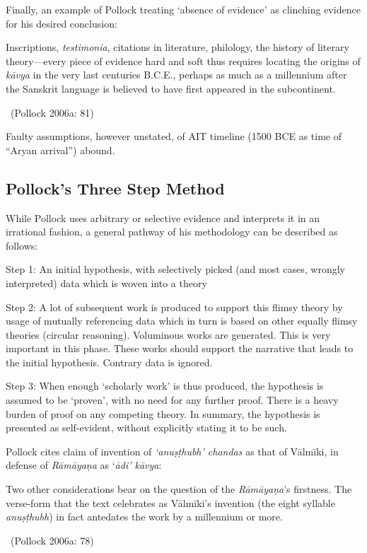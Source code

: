 Finally, an example of Pollock treating ‘absence of evidence’ as clinching evidence for his desired conclusion:

\begin{myquote}
Inscriptions, \textit{testimonia}, citations in literature, philology, the history of literary theory—every piece of evidence hard and soft thus requires locating the origins of \textit{kāvya} in the very last centuries B.C.E., perhaps as much as a millennium after the Sanskrit language is believed to have ﬁrst appeared in the subcontinent. 

~\hfill (Pollock 2006a: 81)
\end{myquote}

Faulty assumptions, however unstated, of AIT timeline (1500 BCE as time of “Aryan arrival”) abound.


\subsection*{Pollock’s Three Step Method}

While Pollock uses arbitrary or selective evidence and interprets it in an irrational fashion, a general pathway of his methodology can be described as follows:

Step 1: An initial hypothesis, with selectively picked (and most cases, wrongly interpreted) data which is woven into a theory

Step 2: A lot of subsequent work is produced to support this flimsy theory by usage of mutually referencing data which in turn is based on other equally flimsy theories (circular reasoning). Voluminous works are generated. This is very important in this phase. These works should support the narrative that leads to the initial hypothesis. Contrary data is ignored.

Step 3: When enough ‘scholarly work’ is thus produced, the hypothesis is assumed to be ‘proven’, with no need for any further proof. There is a heavy burden of proof on any competing theory. In summary, the hypothesis is presented as self-evident, without explicitly stating it to be such.

Pollock cites claim of invention of \textit{‘anuṣṭhubh’ chandas} as that of Vālmīki, in defense of \textit{Rāmāyaṇa} as ‘\textit{ādi’ kāvya}:

\begin{myquote}
Two other considerations bear on the question of the \textit{Rāmāyaṇa}’s ﬁrstness. The verse-form that the text celebrates as Vālmīki’s invention (the eight syllable \textit{anuṣṭhubh}) in fact antedates the work by a millennium or more. 

~\hfill (Pollock 2006a: 78)
\end{myquote}

